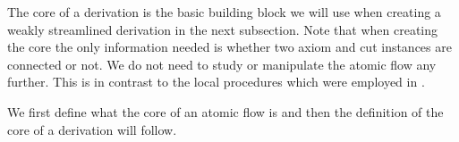 \documentclass[a4paper]{llncs}
\begin{document}
The core of a derivation is the basic building block we will use when creating a weakly streamlined derivation in the next subsection. Note that when creating the core the only information needed is whether two axiom and cut instances are connected or not. We do not need to study or manipulate the atomic flow any further. This is in contrast to the local procedures which were employed in \cite{GuglGund:07:Normalis:lr}.

We first define what the core of an atomic flow is and then the definition of the core of a derivation will follow.

\newcommand{\Core}{\mathsf{Core}}

\end{document}
